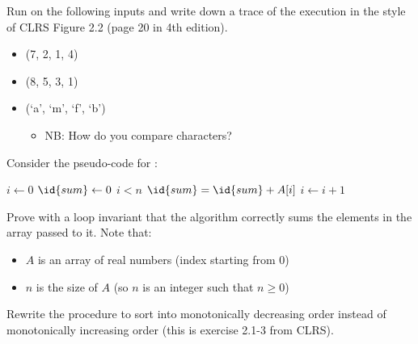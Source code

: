 \documentclass{article}
\begin{document}
\thispagestyle{fancy}

\begin{Exercise}

    \Question
    Run  on the following inputs and write down a trace of
    the execution in the style of CLRS Figure 2.2 (page 20 in 4th edition).

    \begin{itemize}
        \item (7, 2, 1, 4)
        \item (8, 5, 3, 1)
        \item (`a', `m', `f', `b')
            \begin{itemize}
                \item NB: How do you compare characters?
            \end{itemize}
    \end{itemize}

\end{Exercise}

\begin{Exercise}

    \noindent
    Consider the pseudo-code for :
    
    \begin{codebox}
        \li $i \gets 0$
        \li $\id{sum} \gets 0$
        \li \While $i < n$ \Then
            \li $\id{sum} = \id{sum} + A[i]$
            \li $i \gets i + 1$
        \End
        \li \Return {}
    \end{codebox}

    \Question
    Prove with a loop invariant that the algorithm correctly sums the elements
    in the array passed to it. Note that:

    \begin{itemize}
        \item $A$ is an array of real numbers (index starting from 0)
        \item $n$ is the size of $A$ (so $n$ is an integer such that $n \geq 0$)
    \end{itemize}

\end{Exercise}
    
\begin{Exercise}
    \Question
    Rewrite the  procedure to sort into monotonically
    decreasing order instead of monotonically increasing order (this is exercise
    2.1-3 from CLRS).
\end{Exercise}
\end{document}
